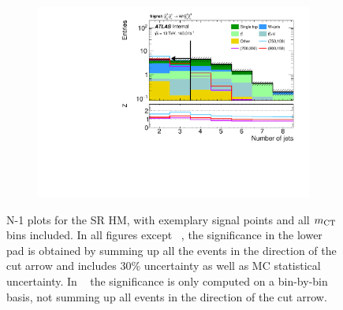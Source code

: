 \begin{figure}
\begin{subfigure}[b]{0.4\linewidth}
		\caption{\label{fig:Wh_reopt_second_round_n1_srhm_mlb1}}
	\end{subfigure}%
	\begin{subfigure}[b]{0.4\linewidth}
		\centering\includegraphics[width=\textwidth]{n1_SRHM_mct_bins/nJet30.pdf}
		\caption{\label{fig:Wh_reopt_second_round_n1_srhm_njet}}
	\end{subfigure}
	\caption{N-1 plots for the SR HM, with exemplary signal points and all $m_{\textrm{CT}}$ bins included. In all figures except \figname~, the significance in the lower pad is obtained by summing up all the events in the direction of the cut arrow and includes 30\% uncertainty as well as MC statistical uncertainty. In \figname~ the significance is only computed on a bin-by-bin basis, \ie not summing up all events in the direction of the cut arrow.}
	\label{fig:Wh_reopt_second_round_n1_srhm}
\end{figure}




